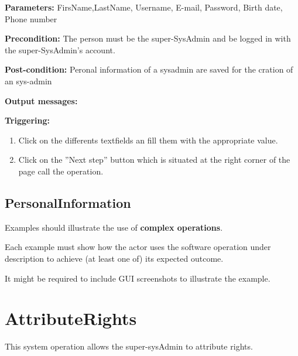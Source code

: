\begin{description}

\item \textbf{Parameters:} FirsName,LastName, Username, E-mail, Password, Birth
date, Phone number
\item \textbf{Precondition:} The person must be the super-SysAdmin and be logged
in with the super-SysAdmin's account.
\item \textbf{Post-condition:} Peronal information of a sysadmin are saved
for the cration of an sys-admin
\item \textbf{Output messages:} 


\item \textbf{Triggering:}
\begin{enumerate}
\item Click on the differents textfields an fill them with the appropriate
value.
\item Click on the ''Next step'' button which is situated at the right corner of
the page call the operation.


\end{enumerate}

 
\end{description}

 
\subsection{PersonalInformation}
Examples should illustrate the use of \textbf{complex operations}.

Each example must show how the actor uses the software operation under
description to achieve (at least one of) its expected outcome.

It might be required to include GUI screenshots to illustrate the example.






\section{AttributeRights}
\label{operation:AttributeRights}
This system operation allows the super-sysAdmin to attribute rights.

